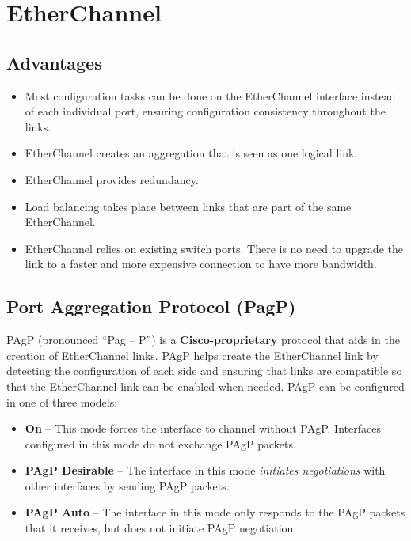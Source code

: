 \chapter{EtherChannel}

\section{Advantages}

\begin{itemize}
\item Most configuration tasks can be done on the EtherChannel interface instead of each individual port, ensuring configuration consistency throughout the links.
\item EtherChannel creates an aggregation that is seen as one logical link. 
\item EtherChannel provides redundancy.
\item Load balancing takes place between links that are part of the same EtherChannel. 
\item EtherChannel relies on existing switch ports. There is no need to upgrade the link to a faster and more expensive connection to have more bandwidth.
\end{itemize}

\section{Port Aggregation Protocol (PagP)}

PAgP (pronounced ``Pag – P”) is a \textbf{Cisco-proprietary} protocol that aids in the  creation of EtherChannel links. PAgP helps create the EtherChannel link by detecting the configuration of each side and ensuring that links are compatible so that the EtherChannel link can be enabled when needed. PAgP can be configured in one of three models:

\begin{itemize}
\item \textbf{On} -- This mode forces the interface to channel without PAgP. Interfaces configured in this mode do not exchange PAgP packets.
\item \textbf{PAgP Desirable} -- The interface in this mode \emph{initiates negotiations} with other interfaces by sending PAgP packets.
\item \textbf{PAgP Auto} -- The interface in this mode only responds to the PAgP packets that it receives, but does not initiate PAgP negotiation.
\end{itemize}

